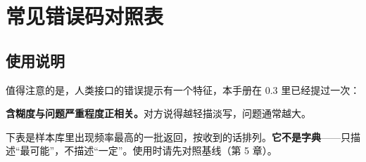 \chapter{常见错误码对照表}


\section{使用说明}

值得注意的是，人类接口的错误提示有一个特征，本手册在 0.3 里已经提过一次：

\begin{mdquote}
\textbf{含糊度与问题严重程度正相关。}对方说得越轻描淡写，问题通常越大。
\end{mdquote}

下表是样本库里出现频率最高的一批返回，按收到的话排列。\textbf{它不是字典}——只描述“最可能”，不描述“一定”。使用时请先对照基线（第 5 章）。

